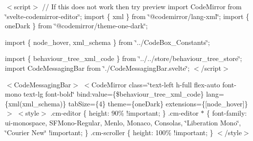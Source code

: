 $<$script$>$ // If this does not work then try preview import Code\+Mirror from \char`\"{}svelte-\/codemirror-\/editor\char`\"{}; import \{ xml \} from \char`\"{}@codemirror/lang-\/xml\char`\"{}; import \{ one\+Dark \} from \char`\"{}@codemirror/theme-\/one-\/dark\char`\"{};

import \{ node\+\_\+hover, xml\+\_\+schema \} from \char`\"{}../\+Code\+Box\+\_\+\+Constants\char`\"{};

import \{ behaviour\+\_\+tree\+\_\+xml\+\_\+code \} from \char`\"{}../../store/behaviour\+\_\+tree\+\_\+store\char`\"{}; import Code\+Messaging\+Bar from \char`\"{}./\+Code\+Messaging\+Bar.\+svelte\char`\"{}; $<$/script$>$

 $<$\+Code\+Messaging\+Bar$>$ $<$\+Code\+Mirror         class=\char`\"{}text-\/left h-\/full flex-\/auto font-\/mono text-\/lg font-\/bold\char`\"{}         bind\+:value=\{\$behaviour\+\_\+tree\+\_\+xml\+\_\+code\}         lang=\{xml(xml\+\_\+schema)\}         tab\+Size=\{4\}         theme=\{one\+Dark\}         extensions=\{\mbox{[}node\+\_\+hover\mbox{]}\}     $>$ $<$style$>$ .cm-\/editor \{ height\+: 90\% !important; \} .cm-\/editor $\ast$ \{ font-\/family\+: ui-\/monospace, SFMono-\/\+Regular, Menlo, Monaco, Consolas, \char`\"{}\+Liberation Mono\char`\"{}, \char`\"{}\+Courier New\char`\"{} !important; \} .cm-\/scroller \{ height\+: 100\% !important; \} $<$/style$>$  